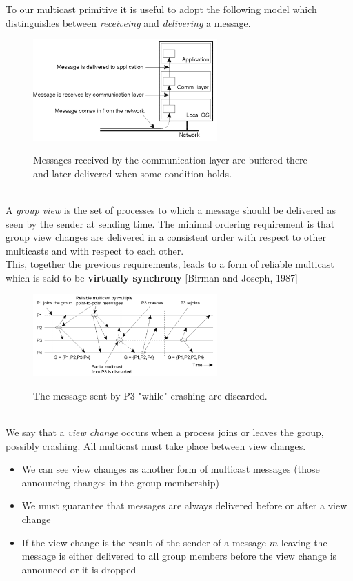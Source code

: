 \documentclass[10pt,a4paper]{article}
\begin{document}
To our multicast primitive it is useful to adopt the following model which distinguishes between \textit{receiveing} and \textit{delivering} a message.
\begin{figure}[h!]
\hfill \includegraphics[width=200pt]{images/virtual-synchrony.png}\hspace*{\fill}
  \label{fig:virtual-synchrony}
  \caption{Messages received by the communication layer are buffered there and later delivered when some condition holds.}
\end{figure} \\
A \textit{group view} is the set of processes to which a message should be delivered as seen by the sender at sending time. The minimal ordering requirement is that group view changes are delivered in a consistent order with respect to other multicasts and with respect to each other. \\ This, together the previous requirements, leads to a form of reliable multicast which is said to be \textbf{virtually synchrony} [Birman and Joseph, 1987] \pagebreak
\begin{figure}[h!]
\hfill \includegraphics[width=200pt]{images/virtual-synchrony2.png}\hspace*{\fill}
  \label{fig:virtual-synchrony2}
  \caption{The message sent by P3 "while" crashing are discarded.}
\end{figure} \\
We say that a \textit{view change} occurs when a process joins or leaves the group, possibly crashing. All multicast must take place between view changes.
\begin{itemize}
	\item We can see view changes as another form of multicast messages (those announcing changes in the group membership)
	\item We must guarantee that messages are always delivered before or after a view change
	\item If the view change is the result of the sender of a message $m$ leaving the message is either delivered to all group members before the view change is announced or it is dropped
\end{itemize}
\end{document}
